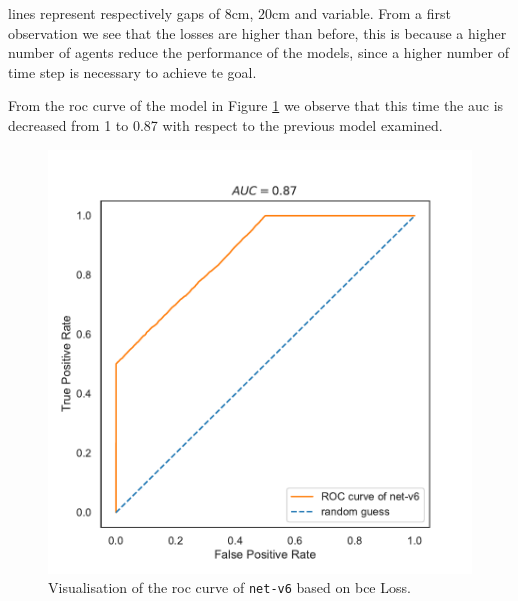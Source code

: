 \noindent
lines represent respectively gaps of $8$\gls{cm}, $20$\gls{cm} and variable. 
From a first observation we see that the losses are higher than before, this is 
because a higher number of agents reduce the performance of the models, 
since 
a higher number of time step is necessary to achieve te goal.

From the \gls{roc} curve of the model in Figure \ref{fig:net-v6auc} we 
observe 
that this time the \gls{auc} is decreased from 1 to 0.87 with respect to the 
previous model examined. 
\begin{figure}[!htb]
	\centering
	\includegraphics[width=.45\textwidth]{contents/images/net-v6/roc-net-v6(a)}%
	\caption[Evaluation of the \gls{roc} of \texttt{net-v6}.]{Visualisation of the 
		\gls{roc} curve of \texttt{net-v6} based on \gls{bce} Loss.}
	\label{fig:net-v6auc}
\end{figure}

